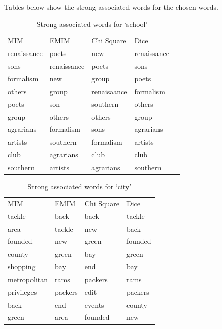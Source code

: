 \documentclass[letterpaper,11pt]{article}
\begin{document}
Tables below show the strong associated words for the chosen words.

\begin{table}[]
\centering
\caption{Strong associated words for `school'}
\label{my-label}
\begin{tabular}{lllll}
MIM         & EMIM        & Chi Square  & Dice        &  \\
renaissance & poets       & new         & renaissance &  \\
sons        & renaissance & poets       & sons        &  \\
formalism   & new         & group       & poets       &  \\
others      & group       & renaisaance & formalism   &  \\
poets       & son         & southern    & others      &  \\
group       & others      & others      & group       &  \\
agrarians   & formalism   & sons        & agrarians   &  \\
artists     & southern    & formalism   & artists     &  \\
club        & agrarians   & club        & club        &  \\
southern    & artists     & agrarians   & southern    & 
\end{tabular}
\end{table}


\begin{table}[]
\centering
\caption{Strong associated words for `city'}
\label{my-label}
\begin{tabular}{llll}
MIM          & EMIM    & Chi Square & Dice    \\
tackle       & back    & back       & tackle  \\
area         & tackle  & new        & back    \\
founded      & new     & green      & founded \\
county       & green   & bay        & green   \\
shopping     & bay     & end        & bay     \\
metropolitan & rams    & packers    & rams    \\
privileges   & packers & edit       & packers \\
back         & end     & events     & county  \\
green        & area    & founded    & new    
\end{tabular}
\end{table}
\end{document}
